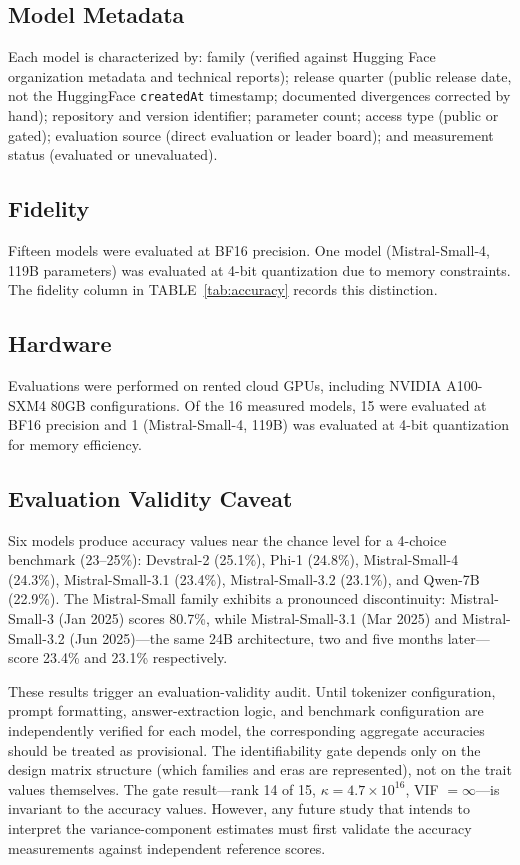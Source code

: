 \documentclass[11pt]{article}
\theoremstyle{definition}
\theoremstyle{plain}
\begin{document}
\subsection{Model Metadata}
Each model is characterized by: family (verified against Hugging Face organization metadata and technical reports); release quarter (public release date, not the HuggingFace \texttt{createdAt} timestamp; documented divergences corrected by hand); repository and version identifier; parameter count; access type (public or gated); evaluation source (direct evaluation or leader board); and measurement status (evaluated or unevaluated).

\subsection{Fidelity}
Fifteen models were evaluated at BF16 precision. One model (Mistral-Small-4, 119B parameters) was evaluated at 4-bit quantization due to memory constraints. The fidelity column in TABLE~\ref{tab:accuracy} records this distinction.

\subsection{Hardware}
Evaluations were performed on rented cloud GPUs, including NVIDIA A100-SXM4 80GB configurations. Of the 16 measured models, 15 were evaluated at BF16 precision and 1 (Mistral-Small-4, 119B) was evaluated at 4-bit quantization for memory efficiency.

\subsection{Evaluation Validity Caveat}
Six models produce accuracy values near the chance level for a 4-choice benchmark (23--25\%): Devstral-2 (25.1\%), Phi-1 (24.8\%), Mistral-Small-4 (24.3\%), Mistral-Small-3.1 (23.4\%), Mistral-Small-3.2 (23.1\%), and Qwen-7B (22.9\%). The Mistral-Small family exhibits a pronounced discontinuity: Mistral-Small-3 (Jan 2025) scores 80.7\%, while Mistral-Small-3.1 (Mar 2025) and Mistral-Small-3.2 (Jun 2025)---the same 24B architecture, two and five months later---score 23.4\% and 23.1\% respectively.

These results trigger an evaluation-validity audit. Until tokenizer configuration, prompt formatting, answer-extraction logic, and benchmark configuration are independently verified for each model, the corresponding aggregate accuracies should be treated as provisional. The identifiability gate depends only on the design matrix structure (which families and eras are represented), not on the trait values themselves. The gate result---rank 14 of 15, $\kappa = 4.7 \times 10^{16}$, VIF $= \infty$---is invariant to the accuracy values. However, any future study that intends to interpret the variance-component estimates must first validate the accuracy measurements against independent reference scores.
\end{document}
